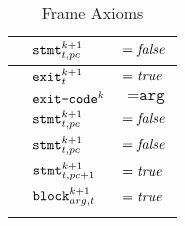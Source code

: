 \begin{longtabu}{llX[m]}
    & $\texttt{stmt}^{k + 1}_{t, pc}$ & $= \textit{false}$ \\
  \hline
    & $\texttt{exit}^{k + 1}_t$       & $= \textit{true}$ \\
    & $\texttt{exit-code}^k$           & \vspace{.15cm} $= \texttt{arg}$ \\
    & $\texttt{stmt}^{k + 1}_{t, pc}$ & $= \textit{false}$ \\
  \hline
    & $\texttt{stmt}^{k + 1}_{t, pc}$     & $= \textit{false}$ \\
    & $\texttt{stmt}^{k + 1}_{t, pc + 1}$ & $= \textit{true}$ \\
    & $\texttt{block}^{k + 1}_{arg, t}$   & $= \textit{true}$ \\
  \lasthline
  \caption{Frame Axioms}
  \label{tbl:axioms}
\end{longtabu}






